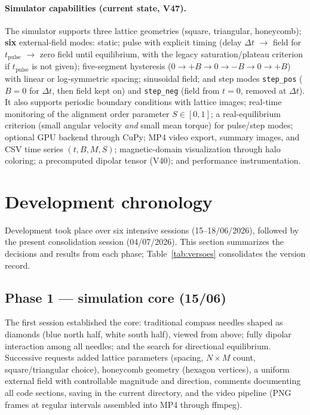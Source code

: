 \documentclass[11pt,a4paper]{article}
\newcommand{\code}[1]{\texttt{#1}}
\begin{document}
\paragraph{Simulator capabilities (current state, V47).}
The simulator supports three lattice geometries (square, triangular, honeycomb); \textbf{six} external-field modes: static; pulse with explicit timing (delay $\Delta t$ $\to$ field for $t_{\mathrm{pulse}}$ $\to$ zero field until equilibrium, with the legacy saturation/plateau criterion if $t_{\mathrm{pulse}}$ is not given); five-segment hysteresis ($0 \to +B \to 0 \to -B \to 0 \to +B$) with linear or log-symmetric spacing; sinusoidal field; and step modes \code{step\_pos} ($B{=}0$ for $\Delta t$, then field kept on) and \code{step\_neg} (field from $t{=}0$, removed at $\Delta t$). It also supports periodic boundary conditions with lattice images; real-time monitoring of the alignment order parameter $S \in [0,1]$; a real-equilibrium criterion (small angular velocity \emph{and} small mean torque) for pulse/step modes; optional GPU backend through CuPy; MP4 video export, summary images, and CSV time series $(t, B, M, S)$; magnetic-domain visualization through halo coloring; a precomputed dipolar tensor (V40); and performance instrumentation.

\section{Development chronology}

Development took place over six intensive sessions (15--18/06/2026), followed by the present consolidation session (04/07/2026). This section summarizes the decisions and results from each phase; Table~\ref{tab:versoes} consolidates the version record.

\subsection{Phase 1 --- simulation core (15/06)}

The first session established the core: traditional compass needles shaped as diamonds (blue north half, white south half), viewed from above; fully dipolar interaction among all needles; and the search for directional equilibrium. Successive requests added lattice parameters (spacing, $N \times M$ count, square/triangular choice), honeycomb geometry (hexagon vertices), a uniform external field with controllable magnitude and direction, comments documenting all code sections, saving in the current directory, and the video pipeline (PNG frames at regular intervals assembled into MP4 through ffmpeg).
\end{document}
